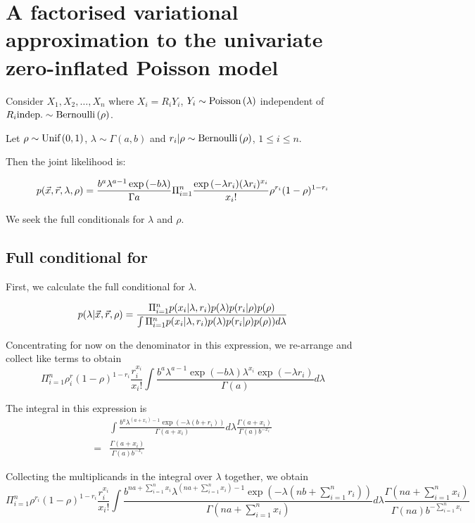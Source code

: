 \documentclass{amsart}
\begin{document}
\section{A factorised variational approximation to the univariate zero-inflated Poisson model}
Consider $X_1, X_2, \ldots, X_n$ where $X_i = R_i Y_i$, $Y_i \sim \text{Poisson} \left( \lambda \right)$ independent of
$R_i \text{indep.} \sim \text{Bernoulli} \left( \rho \right)$.

Let $\rho \sim \text{Unif} \left( 0, 1 \right)$, $\lambda \sim \Gamma(a, b)$ and $r_i | \rho \sim \text{Bernoulli} \left( \rho \right)$, $1 \leq i \leq n$.

Then the joint likelihood is:

$$
p(\Vec{x}, \Vec{r}, \lambda, \rho) = \frac{b^a \lambda^{a - 1} \exp{(-b \lambda)}}{\Gamma{a}} \Pi_{i=1}^n \frac{\exp{(-\lambda r_i)} (\lambda r_i)^{x_i}}{x_i !} \rho^{r_i} (1 - \rho)^{1 - r_i}
$$

We seek the full conditionals for $\lambda$ and $\rho$.

\subsection{Full conditional for \lambda}
First, we calculate the full conditional for $\lambda$.

\begin{align*}
p(\lambda|\Vec{x}, \Vec{r}, \rho) &= \frac{\Pi_{i=1}^n p(x_i | \lambda, r_i) p(\lambda) p(r_i|\rho) p(\rho)}{\int \Pi_{i=1}^n p(x_i | \lambda, r_i) p(\lambda) p(r_i|\rho) p(\rho)) d \lambda} \\
\end{align*}

Concentrating for now on the denominator in this expression, we re-arrange and collect
like terms to obtain
$$
\Pi_{i=1}^n \rho^r_i (1 - \rho)^{1 - r_i} \frac{r_i^{x_i}}{x_i !}
	\int \frac{b^a \lambda^{a - 1} \exp{(-b \lambda)} \lambda^{x_i} \exp{(-\lambda r_i)}}{\Gamma{(a)}} d \lambda
$$

The integral in this expression is
\begin{align*}
& \int \frac{b^a \lambda^{(a + x_i) - 1} \exp{(-\lambda(b + r_i))}}{\Gamma{(a + x_i)}} d \lambda \frac{\Gamma{(a+ x_i)}}{\Gamma{(a)} b^{-x_i}} \\
=& \frac{\Gamma{(a+ x_i)}}{\Gamma{(a)} b^{-x_i}}
\end{align*}

Collecting the multiplicands in the integral over $\lambda$ together, we obtain
$$
\Pi_{i=1}^n \rho^{r_i} (1 - \rho)^{1 - r_i} \frac{r_i^{x_i}}{x_i!}
	\int \frac{b^{na + \sum_{i=1}^n x_i} \lambda^{(na + \sum_{i=1}^n x_i) - 1} \exp{(-\lambda(nb + \sum_{i=1}^n r_i))}}{\Gamma{(na + \sum_{i=1}^n x_i)}} d \lambda
	\frac{\Gamma{(na + \sum_{i=1}^n x_i)}}{\Gamma{(na)} b^{-\sum_{i=1}^n x_i}}
$$
\end{document}
